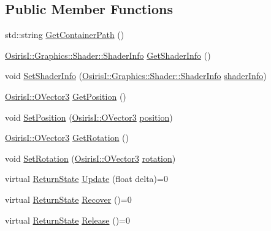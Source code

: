 \subsection*{Public Member Functions}
\begin{DoxyCompactItemize}
\item 
std\-::string \hyperlink{class_osiris_i_1_1_graphics_1_1_actors_1_1_i_mesh_af2e9486aea67fca0ba4ac3cbd66dbb97}{Get\-Container\-Path} ()
\item 
\hyperlink{struct_osiris_i_1_1_graphics_1_1_shader_1_1_shader_info}{Osiris\-I\-::\-Graphics\-::\-Shader\-::\-Shader\-Info} \hyperlink{class_osiris_i_1_1_graphics_1_1_actors_1_1_i_mesh_a04a7d4a7ca1b3fcc83fce7254fe15c8f}{Get\-Shader\-Info} ()
\item 
void \hyperlink{class_osiris_i_1_1_graphics_1_1_actors_1_1_i_mesh_a7ff9e07db3acc152a0516b63be97bd22}{Set\-Shader\-Info} (\hyperlink{struct_osiris_i_1_1_graphics_1_1_shader_1_1_shader_info}{Osiris\-I\-::\-Graphics\-::\-Shader\-::\-Shader\-Info} \hyperlink{class_osiris_i_1_1_graphics_1_1_actors_1_1_i_mesh_a372e7bb6ba6156e2aaad031338440ad1}{shader\-Info})
\item 
\hyperlink{struct_osiris_i_1_1_o_vector3}{Osiris\-I\-::\-O\-Vector3} \hyperlink{class_osiris_i_1_1_graphics_1_1_actors_1_1_i_mesh_ab81225a235480bfc13d51f51765cdf20}{Get\-Position} ()
\item 
void \hyperlink{class_osiris_i_1_1_graphics_1_1_actors_1_1_i_mesh_abd25ef1e688227ca14a7715409dc10e1}{Set\-Position} (\hyperlink{struct_osiris_i_1_1_o_vector3}{Osiris\-I\-::\-O\-Vector3} \hyperlink{class_osiris_i_1_1_graphics_1_1_actors_1_1_i_mesh_a95c7870148773aa2ccffa6c9761cc510}{position})
\item 
\hyperlink{struct_osiris_i_1_1_o_vector3}{Osiris\-I\-::\-O\-Vector3} \hyperlink{class_osiris_i_1_1_graphics_1_1_actors_1_1_i_mesh_a2826b5d2b83b61d534aa64674aa3c5b3}{Get\-Rotation} ()
\item 
void \hyperlink{class_osiris_i_1_1_graphics_1_1_actors_1_1_i_mesh_a2a6df60d3d7c2d0f8f095f7a66b34660}{Set\-Rotation} (\hyperlink{struct_osiris_i_1_1_o_vector3}{Osiris\-I\-::\-O\-Vector3} \hyperlink{class_osiris_i_1_1_graphics_1_1_actors_1_1_i_mesh_a14ba64505fafd000597e878acaf0dcc5}{rotation})
\item 
virtual \hyperlink{namespace_osiris_i_a8f53bf938dc75c65c6a529694514013e}{Return\-State} \hyperlink{class_osiris_i_1_1_graphics_1_1_actors_1_1_i_mesh_aba831f84999aa4b4c93a4af7910aeb17}{Update} (float delta)=0
\item 
virtual \hyperlink{namespace_osiris_i_a8f53bf938dc75c65c6a529694514013e}{Return\-State} \hyperlink{class_osiris_i_1_1_graphics_1_1_actors_1_1_i_mesh_a430e542bbfe36897c14ad3c6b7c9cb91}{Recover} ()=0
\item 
virtual \hyperlink{namespace_osiris_i_a8f53bf938dc75c65c6a529694514013e}{Return\-State} \hyperlink{class_osiris_i_1_1_graphics_1_1_actors_1_1_i_mesh_a1096812231018b98ad86d74d3fb2a438}{Release} ()=0
\end{DoxyCompactItemize}
